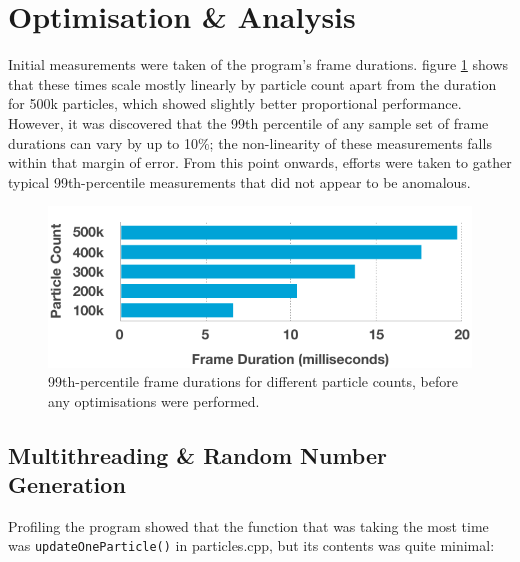 \documentclass[11pt, a4paper, twocolumn]{article}
\begin{document}
\section{Optimisation \& Analysis}


Initial measurements were taken of the program's frame durations. figure \ref{fig:initialtimes} shows that these times scale mostly linearly by particle count apart from the duration for 500k particles, which showed slightly better proportional performance. However, it was discovered that the 99th percentile of any sample set of frame durations can vary by up to 10\%; the non-linearity of these measurements falls within that margin of error. From this point onwards, efforts were taken to gather typical 99th-percentile measurements that did not appear to be anomalous.

\begin{figure}[h]
\includegraphics[width=\linewidth]{initialtimes}
\caption{99th-percentile frame durations for different particle counts, before any optimisations were performed.}
\label{fig:initialtimes}
\end{figure}

\subsection{Multithreading \& Random Number Generation} \label{sec:multithread}

Profiling the program showed that the function that was taking the most time was \verb|updateOneParticle()| in particles.cpp, but its contents was quite minimal:
\end{document}
